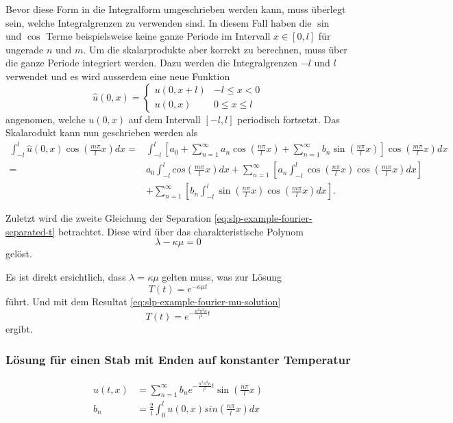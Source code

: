 Bevor diese Form in die Integralform umgeschrieben werden kann, muss überlegt
sein, welche Integralgrenzen zu verwenden sind.
In diesem Fall haben die $ \sin $ und $ \cos $ Terme beispielsweise keine ganze
Periode im Intervall $ x \in [0, l] $ für ungerade $ n $ und $ m $.
Um die skalarprodukte aber korrekt zu berechnen, muss über die ganze Periode
integriert werden.
Dazu werden die Integralgrenzen $-l$ und $l$ verwendet und es wird ausserdem
eine neue Funktion
\[
    \hat{u}(0, x)
    =
    \begin{cases}
        u(0, x + l) & -l \leq x < 0
        \\
        u(0, x) & 0 \leq x \leq l
    \end{cases}
\]
angenomen, welche $u(0, x)$ auf dem Intervall $[-l, l]$ periodisch fortsetzt.
Das Skalarodukt kann nun geschrieben werden als
\[
\begin{aligned}
    \int_{-l}^{l}\hat{u}(0, x)\cos\left(\frac{m \pi}{l}x\right)dx
    =&
    \int_{-l}^{l} \left[a_0
    +
    \sum_{n = 1}^{\infty} a_n\cos\left(\frac{n\pi}{l}x\right)
    +
    \sum_{n = 1}^{\infty} b_n\sin\left(\frac{n\pi}{l}x\right)\right]
    \cos\left(\frac{m \pi}{l}x\right) dx
    \\
    =&
    a_0 \int_{-l}^{l}cos\left(\frac{m \pi}{l}x\right) dx
    +
    \sum_{n = 1}^{\infty}\left[a_n\int_{-l}^{l}\cos\left(\frac{n\pi}{l}x\right)
        \cos\left(\frac{m \pi}{l}x\right)dx\right]
    \\
    &+
    \sum_{n = 1}^{\infty}\left[b_n\int_{-l}^{l}\sin\left(\frac{n\pi}{l}x\right)
        \cos\left(\frac{m \pi}{l}x\right)dx\right].
\end{aligned}
\]

Zuletzt wird die zweite Gleichung der Separation
\eqref{eq:slp-example-fourier-separated-t} betrachtet.
Diese wird über das charakteristische Polynom
\[
    \lambda - \kappa \mu
    =
    0
\]
gelöst.

Es ist direkt ersichtlich, dass $\lambda = \kappa \mu$ gelten muss, was zur
Lösung
\[
    T(t)
    =
    e^{-\kappa \mu t}
\]
führt.
Und mit dem Resultat \eqref{eq:slp-example-fourier-mu-solution}
\[
    T(t)
    =
    e^{-\frac{n^{2}\pi^{2}\kappa}{l^{2}}t}
\]
ergibt.

\subsubsection{Lösung für einen Stab mit Enden auf konstanter Temperatur}
\[
\begin{aligned}
    u(t,x)
    &=
    \sum_{n=1}^{\infty}b_{n}e^{-\frac{n^{2}\pi^{2}\kappa}{l^{2}}t}
    \sin\left(\frac{n\pi}{l}x\right)
    \\
    b_{n}
    &=
    \frac{2}{l}\int_{0}^{l}u(0,x)sin\left(\frac{n\pi}{l}x\right) dx
\end{aligned}
\]

